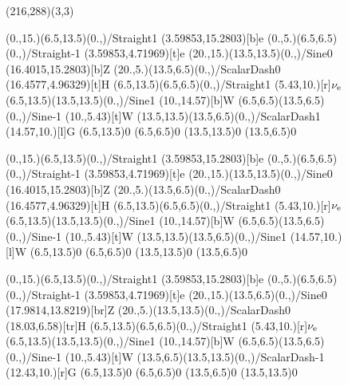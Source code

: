 
\vspace*{-20pt}

\begin{figure}[H]
\begin{center}
\unitlength=1bp%

\begin{feynartspicture}(216,288)(3,3)

\FADiagram{}
\FAProp(0.,15.)(6.5,13.5)(0.,){/Straight}{1}
\FALabel(3.59853,15.2803)[b]{e}
\FAProp(0.,5.)(6.5,6.5)(0.,){/Straight}{-1}
\FALabel(3.59853,4.71969)[t]{e}
\FAProp(20.,15.)(13.5,13.5)(0.,){/Sine}{0}
\FALabel(16.4015,15.2803)[b]{Z}
\FAProp(20.,5.)(13.5,6.5)(0.,){/ScalarDash}{0}
\FALabel(16.4577,4.96329)[t]{H}
\FAProp(6.5,13.5)(6.5,6.5)(0.,){/Straight}{1}
\FALabel(5.43,10.)[r]{$\nu_{\rm e}$}
\FAProp(6.5,13.5)(13.5,13.5)(0.,){/Sine}{1}
\FALabel(10.,14.57)[b]{W}
\FAProp(6.5,6.5)(13.5,6.5)(0.,){/Sine}{-1}
\FALabel(10.,5.43)[t]{W}
\FAProp(13.5,13.5)(13.5,6.5)(0.,){/ScalarDash}{1}
\FALabel(14.57,10.)[l]{G}
\FAVert(6.5,13.5){0}
\FAVert(6.5,6.5){0}
\FAVert(13.5,13.5){0}
\FAVert(13.5,6.5){0}

\FADiagram{}
\FAProp(0.,15.)(6.5,13.5)(0.,){/Straight}{1}
\FALabel(3.59853,15.2803)[b]{e}
\FAProp(0.,5.)(6.5,6.5)(0.,){/Straight}{-1}
\FALabel(3.59853,4.71969)[t]{e}
\FAProp(20.,15.)(13.5,13.5)(0.,){/Sine}{0}
\FALabel(16.4015,15.2803)[b]{Z}
\FAProp(20.,5.)(13.5,6.5)(0.,){/ScalarDash}{0}
\FALabel(16.4577,4.96329)[t]{H}
\FAProp(6.5,13.5)(6.5,6.5)(0.,){/Straight}{1}
\FALabel(5.43,10.)[r]{$\nu_{\rm e}$}
\FAProp(6.5,13.5)(13.5,13.5)(0.,){/Sine}{1}
\FALabel(10.,14.57)[b]{W}
\FAProp(6.5,6.5)(13.5,6.5)(0.,){/Sine}{-1}
\FALabel(10.,5.43)[t]{W}
\FAProp(13.5,13.5)(13.5,6.5)(0.,){/Sine}{1}
\FALabel(14.57,10.)[l]{W}
\FAVert(6.5,13.5){0}
\FAVert(6.5,6.5){0}
\FAVert(13.5,13.5){0}
\FAVert(13.5,6.5){0}

\FADiagram{}
\FAProp(0.,15.)(6.5,13.5)(0.,){/Straight}{1}
\FALabel(3.59853,15.2803)[b]{e}
\FAProp(0.,5.)(6.5,6.5)(0.,){/Straight}{-1}
\FALabel(3.59853,4.71969)[t]{e}
\FAProp(20.,15.)(13.5,6.5)(0.,){/Sine}{0}
\FALabel(17.9814,13.8219)[br]{Z}
\FAProp(20.,5.)(13.5,13.5)(0.,){/ScalarDash}{0}
\FALabel(18.03,6.58)[tr]{H}
\FAProp(6.5,13.5)(6.5,6.5)(0.,){/Straight}{1}
\FALabel(5.43,10.)[r]{$\nu_{\rm e}$}
\FAProp(6.5,13.5)(13.5,13.5)(0.,){/Sine}{1}
\FALabel(10.,14.57)[b]{W}
\FAProp(6.5,6.5)(13.5,6.5)(0.,){/Sine}{-1}
\FALabel(10.,5.43)[t]{W}
\FAProp(13.5,6.5)(13.5,13.5)(0.,){/ScalarDash}{-1}
\FALabel(12.43,10.)[r]{G}
\FAVert(6.5,13.5){0}
\FAVert(6.5,6.5){0}
\FAVert(13.5,6.5){0}
\FAVert(13.5,13.5){0}


\end{feynartspicture}
\end{center}
\end{figure}
